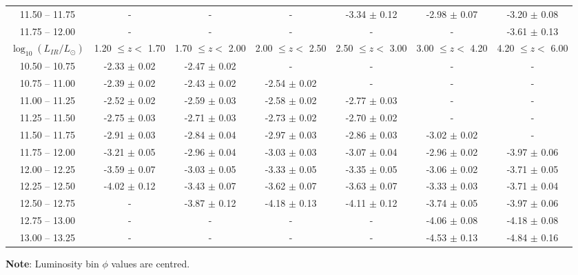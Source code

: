 \begin{table*}
\begin{center}
\begin{tabular}{@{}ccccccc@{}}
        11.50 -- 11.75 & -                & -                & -                & -3.34 $\pm$ 0.12 & -2.98 $\pm$ 0.07 & -3.20 $\pm$ 0.08 \\
        11.75 -- 12.00 & -                & -                & -                & -                & -                & -3.61 $\pm$ 0.13 \\
        \hline
        $\log_{10}(L_{IR}/L_{\odot})$ & 1.20 $\leq z <$ 1.70 & 1.70 $\leq z <$ 2.00 & 2.00 $\leq z <$ 2.50 & 2.50 $\leq z <$ 3.00 & 3.00 $\leq z <$ 4.20 & 4.20 $\leq z <$ 6.00  \\
        \hline
        10.50 -- 10.75 & -2.33 $\pm$ 0.02 & -2.47 $\pm$ 0.02 & - & - & - & - \\
        10.75 -- 11.00 & -2.39 $\pm$ 0.02 & -2.43 $\pm$ 0.02 & -2.54 $\pm$ 0.02 & - & - & - \\
        11.00 -- 11.25 & -2.52 $\pm$ 0.02 & -2.59 $\pm$ 0.03 & -2.58 $\pm$ 0.02 & -2.77 $\pm$ 0.03 & - & - \\
        11.25 -- 11.50 & -2.75 $\pm$ 0.03 & -2.71 $\pm$ 0.03 & -2.73 $\pm$ 0.02 & -2.70 $\pm$ 0.02 & - & - \\
        11.50 -- 11.75 & -2.91 $\pm$ 0.03 & -2.84 $\pm$ 0.04 & -2.97 $\pm$ 0.03 & -2.86 $\pm$ 0.03 & -3.02 $\pm$ 0.02 & - \\
        11.75 -- 12.00 & -3.21 $\pm$ 0.05 & -2.96 $\pm$ 0.04 & -3.03 $\pm$ 0.03 & -3.07 $\pm$ 0.04 & -2.96 $\pm$ 0.02 & -3.97 $\pm$ 0.06 \\
        12.00 -- 12.25 & -3.59 $\pm$ 0.07 & -3.03 $\pm$ 0.05 & -3.33 $\pm$ 0.05 & -3.35 $\pm$ 0.05 & -3.06 $\pm$ 0.02 & -3.71 $\pm$ 0.05 \\
        12.25 -- 12.50 & -4.02 $\pm$ 0.12 & -3.43 $\pm$ 0.07 & -3.62 $\pm$ 0.07 & -3.63 $\pm$ 0.07 & -3.33 $\pm$ 0.03 & -3.71 $\pm$ 0.04 \\
        12.50 -- 12.75 & -                & -3.87 $\pm$ 0.12 & -4.18 $\pm$ 0.13 & -4.11 $\pm$ 0.12 & -3.74 $\pm$ 0.05 & -3.97 $\pm$ 0.06 \\
        12.75 -- 13.00 & -                & -                & -                & -                & -4.06 $\pm$ 0.08 & -4.18 $\pm$ 0.08 \\
        13.00 -- 13.25 & -                & -                & -                & -                & -4.53 $\pm$ 0.13 & -4.84 $\pm$ 0.16
        \botrule
    \end{tabular}
    \end{center}
    \begin{tabnote}
        {\textbf{Note}: Luminosity bin $\phi$ values are centred.}\tnp
    \end{tabnote}
\end{table*}

